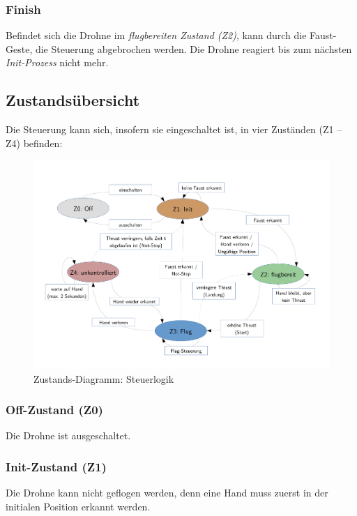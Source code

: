 \subsubsection{Finish}
Befindet sich die Drohne im \textit{flugbereiten Zustand (Z2)}, kann durch die Faust-Geste, die Steuerung abgebrochen werden.
Die Drohne reagiert bis zum nächsten \textit{Init-Prozess} nicht mehr.

\newpage
\subsection{Zustandsübersicht}
\label{sec:concept:stateoverview}
Die Steuerung kann sich, insofern sie eingeschaltet ist, in vier Zuständen (Z1 -- Z4) befinden:

\begin{figure}[H]
	\centering
	\includegraphics[width=1.0\textwidth]{figures/concept/state-diagram-1.pdf}
	\caption{Zustands-Diagramm: Steuerlogik}
\end{figure}

\subsubsection{Off-Zustand (Z0)}
Die Drohne ist ausgeschaltet.

\subsubsection{Init-Zustand (Z1)}
Die Drohne kann nicht geflogen werden, denn eine Hand muss zuerst in der initialen Position erkannt werden.


